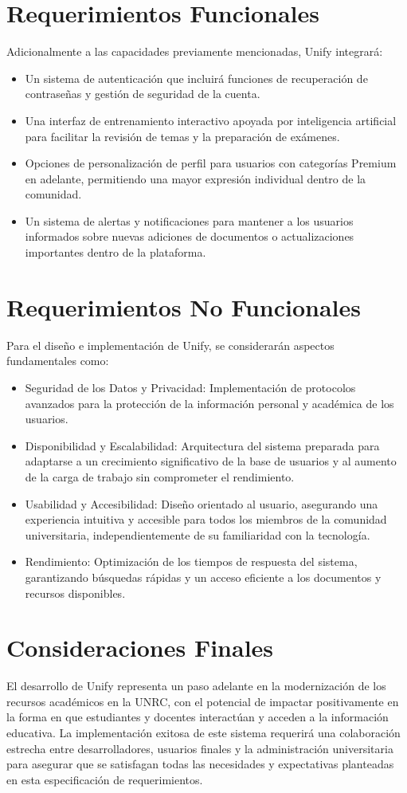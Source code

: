 \documentclass[10pt,twocolumn]{article}
\begin{document}
\section{Requerimientos Funcionales}
Adicionalmente a las capacidades previamente mencionadas, Unify integrará:
\begin{itemize}
  \item Un sistema de autenticación que incluirá funciones de recuperación de contraseñas y gestión de seguridad de la cuenta.
  \item Una interfaz de entrenamiento interactivo apoyada por inteligencia artificial para facilitar la revisión de temas y la preparación de exámenes.
  \item Opciones de personalización de perfil para usuarios con categorías Premium en adelante, permitiendo una mayor expresión individual dentro de la comunidad.
  \item Un sistema de alertas y notificaciones para mantener a los usuarios informados sobre nuevas adiciones de documentos o actualizaciones importantes dentro de la plataforma.
\end{itemize}

\section{Requerimientos No Funcionales}
Para el diseño e implementación de Unify, se considerarán aspectos fundamentales como:
\begin{itemize}
  \item Seguridad de los Datos y Privacidad: Implementación de protocolos avanzados para la protección de la información personal y académica de los usuarios.
  \item Disponibilidad y Escalabilidad: Arquitectura del sistema preparada para adaptarse a un crecimiento significativo de la base de usuarios y al aumento de la carga de trabajo sin comprometer el rendimiento.
  \item Usabilidad y Accesibilidad: Diseño orientado al usuario, asegurando una experiencia intuitiva y accesible para todos los miembros de la comunidad universitaria, independientemente de su familiaridad con la tecnología.
  \item Rendimiento: Optimización de los tiempos de respuesta del sistema, garantizando búsquedas rápidas y un acceso eficiente a los documentos y recursos disponibles.
\end{itemize}

\newpage
\section{Consideraciones Finales}
El desarrollo de Unify representa un paso adelante en la modernización de los recursos académicos en la UNRC, con el potencial de impactar positivamente en la forma en que estudiantes y docentes interactúan y acceden a la información educativa. La implementación exitosa de este sistema requerirá una colaboración estrecha entre desarrolladores, usuarios finales y la administración universitaria para asegurar que se satisfagan todas las necesidades y expectativas planteadas en esta especificación de requerimientos.
\end{document}
